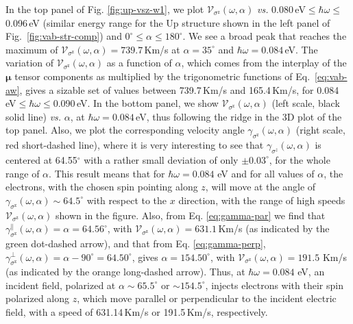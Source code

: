 \documentclass[floatfix,prb,aps,superscriptaddress,showpacs,11pt,preprint,letterpaper]{revtex4}
\begin{document}
In the top panel of Fig. \ref{fig:up-vsz-w1}, we plot
$\mathcal{V}_{\sigma^{\mathrm{z}}} (\omega,\alpha)$ {\it vs.}
0.080\,eV$\leq\hbar\omega\leq$0.096\,eV (similar energy range for the Up
structure shown in the left panel of Fig.~\ref{fig:vab-str-comp}) and
$0^\circ\leq\alpha\leq 180^\circ$. We see a broad peak that reaches the maximum
of $\mathcal{V}_{\sigma^{\mathrm{z}}}(\omega,\alpha) = 739.7$\,Km/s at
$\alpha=35^{\circ}$ and $\hbar\omega= 0.084$\,eV.  The variation of
$\mathcal{V}_{\sigma^{\mathrm{z}}} (\omega,\alpha)$ as a function of $\alpha$,
which comes from the interplay of the $\boldsymbol{\mu}$ tensor components as
multiplied by the  trigonometric functions of Eq.~\eqref{eq:vab-aw}, gives a
sizable set of values between 739.7\,Km/s and 165.4\,Km/s, for
0.084\,eV$\leq\hbar\omega\leq$0.090\,eV. In the bottom panel, we show
$\mathcal{V}_{\sigma^{\mathrm{z}}} (\omega,\alpha)$ (left scale,
black solid line) {\it vs.} $\alpha$, at $\hbar\omega= 0.084$\,eV, thus following the ridge in the 3D
plot of the top panel. Also, we plot the corresponding velocity angle
$\gamma_{\sigma^\mathrm{z}}(\omega,\alpha)$ (right scale, red
short-dashed line), where it
is very interesting to see that $\gamma_{\sigma^z}(\omega,\alpha)$ is centered
at 64.55$^\circ$ with a rather small deviation of only $\pm 0.03^\circ$, for
the whole range of $\alpha$. This result means that for $\hbar\omega=0.084$ eV
and for all values of $\alpha$, the electrons, with the chosen spin pointing
along $z$, will move at the angle of $\gamma_{\sigma^\mathrm{z}}(\omega,\alpha)
\sim 64.5^{\circ}$ with respect to the $x$ direction, with the range of  high
speeds $\mathcal{V}_{\sigma^{\mathrm{z}}} (\omega,\alpha)$ shown in the figure.
Also, from Eq. \eqref{eq:gamma-par} we find that
$\gamma^\parallel_{\sigma^\mathrm{z}} (\omega,\alpha)=\alpha = 64.56^\circ$,
with $\mathcal{V}_{\sigma^{\mathrm{z}}} (\omega,\alpha) = 631.1$\,Km/s 
(as indicated by the green dot-dashed arrow), and that from Eq. \eqref{eq:gamma-perp},
$\gamma^\perp_{\sigma^\mathrm{z}}(\omega,\alpha)=\alpha-90^\circ=64.50^\circ$,
gives $\alpha=154.50^\circ$, with
$\mathcal{V}_{\sigma^{\mathrm{z}}}(\omega,\alpha) = 191.5$ Km/s 
(as indicated by the orange long-dashed 
arrow). 
Thus, at $\hbar\omega=0.084$ eV, an incident field, polarized at
$\alpha \sim 65.5^\circ$ or $\sim 154.5^\circ$, injects electrons with their
spin polarized along $z$, which move parallel or perpendicular to the incident
electric field,  with a speed of 631.14\,Km/s or 191.5\,Km/s, respectively.
\end{document}
